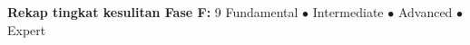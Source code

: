 \documentclass[11pt,a4paper]{exam}
\begin{document}
\vspace{8pt}
\begin{center}\small
\textbf{Rekap tingkat kesulitan Fase F:}
9 Fundamental \;$\bullet$ Intermediate \;$\bullet$ Advanced \;$\bullet$ Expert
\end{center}
\end{document}

